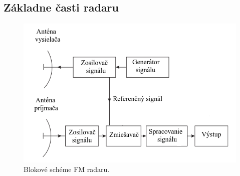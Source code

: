   \subsection{Základne časti radaru}
    \begin{figure}[h]
        \centering
        \includegraphics[width=1.0\textwidth]{obrazky-figures/popis_radaru_own.png}
        \caption{Blokové schéme FM radaru.}
        \label{fig:popis_radaru}
    \end{figure}

